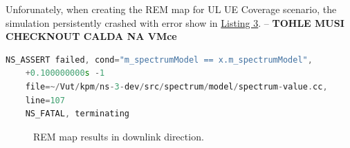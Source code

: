 \documentclass[10pt,a4]{article}
\begin{document}
    Unforunately, when creating the REM map for UL UE Coverage scenario, the simulation persistently crashed with error show in \hyperref[lst:error]{Listing 3}. -- \textbf{TOHLE MUSI CHECKNOUT CALDA NA VMce}

    \begin{lstlisting}[language=C++,caption=Error produced by NS3 when generating UL UE Coverage REM,label=lst:error]
    NS_ASSERT failed, cond="m_spectrumModel == x.m_spectrumModel",
    +0.100000000s -1
    file=~/Vut/kpm/ns-3-dev/src/spectrum/model/spectrum-value.cc,
    line=107
    NS_FATAL, terminating
    \end{lstlisting}

    \begin{figure}[ht!]
    \caption{REM map results in downlink direction.}
    \label{fig:dl}
\end{figure}
\end{document}
